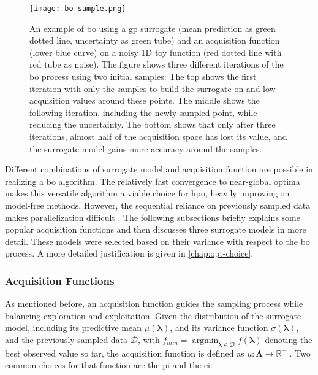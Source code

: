 \begin{figure}[h]
	\centering
	\texttt{[image: bo-sample.png]}
	\caption[An example of \gls{bo} using a \gls{gp} surrogate]{An example of \gls{bo} using a \gls{gp} surrogate (mean prediction as green dotted line, uncertainty as green tube) and an acquisition function (lower blue curve) on a noisy 1D toy function (red dotted line with red tube as noise).
		The figure shows three different iterations of the \gls{bo} process using two initial samples: The top shows the first iteration with only the samples to build the surrogate on and low acquisition values around these points. The middle shows the following iteration, including the newly sampled point, while reducing the uncertainty. The bottom shows that only after three iterations, almost half of the acquisition space has lost its value, and the surrogate model gains more accuracy around the samples.}
	\label{fig:bo-sample}
\end{figure}

Different combinations of surrogate model and acquisition function are possible in realizing a \gls{bo} algorithm. The relatively fast convergence to near-global optima makes this versatile algorithm a viable choice for \gls{hpo}, heavily improving on model-free methods. However, the sequential reliance on previously sampled data makes parallelization difficult \cite{yang2020hyperparameter}.
The following subsections briefly explains some popular acquisition functions and then discusses three surrogate models in more detail. These models were selected based on their variance with respect to the \gls{bo} process. A more detailed justification is given in \cref{chap:opt-choice}.

\subsubsection{Acquisition Functions}
\label{chap:bo-acq}

As mentioned before, an acquisition function guides the sampling process while balancing exploration and exploitation. Given the distribution of the surrogate model, including its predictive mean $\mu(\mathbf{\lambda})$, and its variance function $\sigma(\mathbf{\lambda})$, and the previously sampled data $\mathcal{D}$, with $f_{min} = \operatorname*{argmin}_{\mathbf{\lambda}\in \mathcal{D}} f(\mathbf{\lambda})$ denoting the best observed value so far, the acquisition function is defined as $u: \mathbf{\Lambda} \to \mathbb{R}^+$ \cite{snoek2012practical}. Two common choices for that function are the \gls{pi} and the \gls{ei}.

